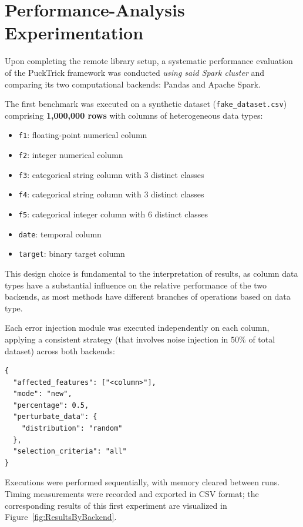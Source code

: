 \documentclass[../main.tex]{subfiles}
\begin{document}
\newpage
\section{Performance-Analysis Experimentation}
\label{sec:Library_stress_test}


Upon completing the remote library setup, a systematic performance evaluation of the PuckTrick framework was conducted \emph{using said Spark cluster} and comparing its two computational backends: Pandas and Apache Spark.

The first benchmark was executed on a synthetic dataset (\texttt{fake\_dataset.csv}) comprising \textbf{1{,}000{,}000 rows} with columns of heterogeneous data types:

\begin{itemize}
    \item \texttt{f1}: floating-point numerical column
    \item \texttt{f2}: integer numerical column
    \item \texttt{f3}: categorical string column with 3 distinct classes
    \item \texttt{f4}: categorical string column with 3 distinct classes
    \item \texttt{f5}: categorical integer column with 6 distinct classes
    \item \texttt{date}: temporal column
    \item \texttt{target}: binary target column
\end{itemize}

This design choice is fundamental to the interpretation of results, as column data types have a substantial influence on the relative performance of the two backends, as most methods have different branches of operations based on data type.

Each error injection module was executed independently on each column, applying a consistent strategy (that involves noise injection in $50\%$ of total dataset) across both backends:

\begin{verbatim}
{
  "affected_features": ["<column>"],
  "mode": "new",
  "percentage": 0.5,
  "perturbate_data": {
    "distribution": "random"
  },
  "selection_criteria": "all"
}
\end{verbatim}

Executions were performed sequentially, with memory cleared between runs. Timing measurements were recorded and exported in CSV format; the corresponding results of this first experiment are visualized in Figure~\ref{fig:ResultsByBackend}.
\end{document}
